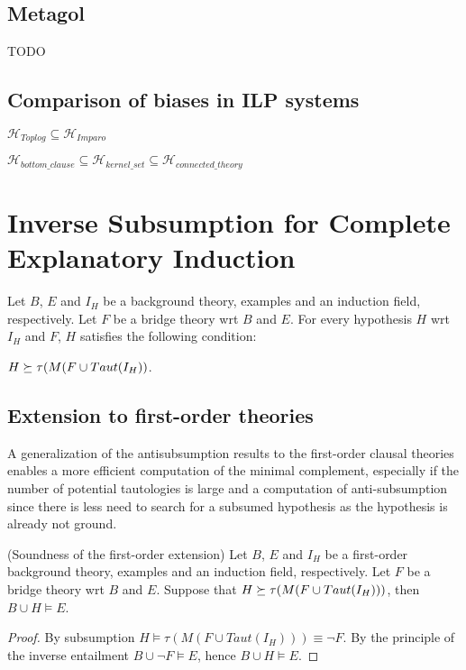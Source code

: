 \subsection{Metagol}
TODO


\subsection{Comparison of biases in ILP systems}
$\mathcal{H}_{Toplog} \subseteq \mathcal{H}_{Imparo}$

$\mathcal{H}_{bottom\_clause} \subseteq \mathcal{H}_{kernel\_set} \subseteq \mathcal{H}_{connected\_theory}$

\section{Inverse Subsumption for Complete Explanatory Induction}
\begin{lemma}\label{yamamoto2012inverseLemma2}\cite{yamamoto2012inverse}
Let $B$, $E$ and $I_H$ be a background theory, examples and an induction field,
respectively. Let $F$ be a bridge theory wrt $B$ and $E$. For every hypothesis $H$ wrt $I_H$ and $F$, $H$ satisfies the following condition:

$H \succeq \tau(M(F \cup Taut(I_H))$.
\end{lemma}

\subsection{Extension to first-order theories}
A generalization of the antisubsumption results to the first-order clausal theories enables a more efficient computation of the minimal complement, especially if the number of potential tautologies is large and a computation of anti-subsumption since there is less need to search for a subsumed hypothesis as the hypothesis is already not ground.

\begin{proposition}(Soundness of the first-order extension)
Let $B$, $E$ and $I_H$ be a first-order background theory, examples and an induction field, respectively. Let $F$ be a bridge theory wrt $B$ and $E$. Suppose that $H \succeq \tau(M(F \cup Taut(I_H)))$, then $B \cup H \models E$.
\end{proposition}
\begin{proof}
By subsumption $H \models \tau(M(F \cup Taut(I_H))) \equiv \neg F$. By the principle of the inverse entailment $B \cup \neg F \models E$, hence
$B \cup H \models E$.
\end{proof}

